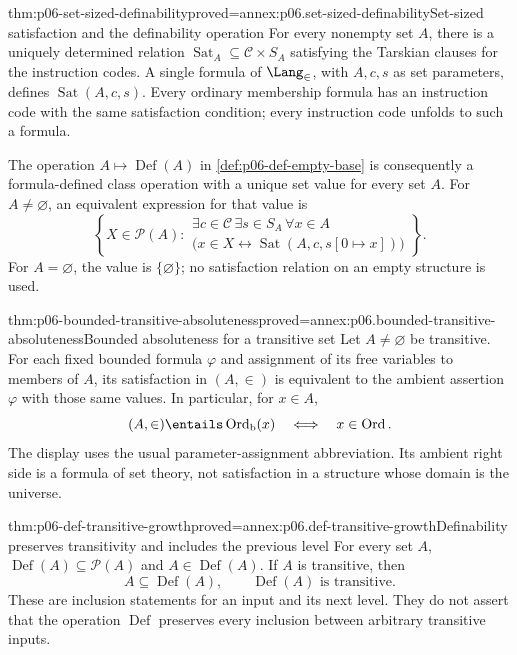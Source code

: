 \begin{hbtheorem}{thm:p06-set-sized-definability}{proved=annex:p06.set-sized-definability}{Set-sized satisfaction and the definability operation}
For every nonempty set \(A\), there is a uniquely determined
relation \(\operatorname{Sat}_A\subseteq\mathcal C\times S_A\)
satisfying the Tarskian clauses for the instruction codes.  A single
formula of \(\Lang_{\in}\), with \(A,c,s\) as set parameters,
defines \(\operatorname{Sat}(A,c,s)\).  Every ordinary membership
formula has an instruction code with the same satisfaction condition;
every instruction code unfolds to such a formula.

The operation \(A\mapsto\operatorname{Def}(A)\) in
\cref{def:p06-def-empty-base} is consequently a formula-defined
class operation with a unique set value for every set \(A\).
For \(A\ne\varnothing\), an equivalent expression for that value is
\[
 \left\{X\in\mathcal{P}(A):
 \begin{gathered}
  \exists c\in\mathcal C\,\exists s\in S_A\,\forall x\in A\\[-2pt]
  \bigl(x\in X\leftrightarrow
       \operatorname{Sat}(A,c,s[0\mapsto x])\bigr)
 \end{gathered}
 \right\}.
\]
For \(A=\varnothing\), the value is \(\{\varnothing\}\);
no satisfaction relation on an empty structure is used.
\end{hbtheorem}

\begin{hbtheorem}{thm:p06-bounded-transitive-absoluteness}{proved=annex:p06.bounded-transitive-absoluteness}{Bounded absoluteness for a transitive set}
Let \(A\ne\varnothing\) be transitive.  For each fixed bounded
formula \(\varphi\) and assignment of its free variables to members
of \(A\), its satisfaction in \((A,\in)\) is equivalent to the
ambient assertion \(\varphi\) with those same values.  In particular,
for \(x\in A\),
\[
 (A,\in)\entails\operatorname{Ord}_{\mathrm b}(x)
 \quad\Longleftrightarrow\quad x\in\operatorname{Ord}.
\]
The display uses the usual parameter-assignment abbreviation.  Its
ambient right side is a formula of set theory, not satisfaction in
a structure whose domain is the universe.
\end{hbtheorem}

\begin{hblemma}{thm:p06-def-transitive-growth}{proved=annex:p06.def-transitive-growth}{Definability preserves transitivity and includes the previous level}
For every set \(A\),
\(\operatorname{Def}(A)\subseteq\mathcal{P}(A)\) and
\(A\in\operatorname{Def}(A)\).  If \(A\) is transitive, then
\[
 A\subseteq\operatorname{Def}(A),
 \qquad \operatorname{Def}(A)\text{ is transitive}.
\]
These are inclusion statements for an input and its next level.
They do not assert that the operation \(\operatorname{Def}\)
preserves every inclusion between arbitrary transitive inputs.
\end{hblemma}

